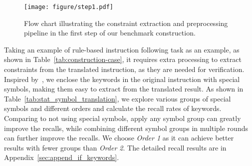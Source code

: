 \begin{figure}[!t]
    \centering
    \texttt{[image: figure/step1.pdf]}
    \caption{Flow chart illustrating the constraint extraction and preprocessing pipeline in the first step of our benchmark construction.}
    \label{fig:step1}
\end{figure}



Taking an example of rule-based instruction following task as an example, as shown in Table~\ref{tab:construction-case}, it requires extra processing to extract constraints from the translated instruction, as they are needed for verification.
Inspired by~\citet{yuan-etal-2020-enhancing}, we enclose the keywords in the original instruction with special symbols, making them easy to extract from the translated result.
As shown in Table~\ref{tab:stat_symbol_translation}, we explore various groups of special symbols and different orders and calculate the recall rates of keywords.
Comparing to not using special symbols, apply any symbol group can greatly improve the recalls, while combining different symbol groups in multiple rounds can further improve the recalls.
We choose \textit{Order 1} as it can achieve better results with fewer groups than \textit{Order 2}.
The detailed recall results are in Appendix~\ref{sec:append_if_keywords}.


